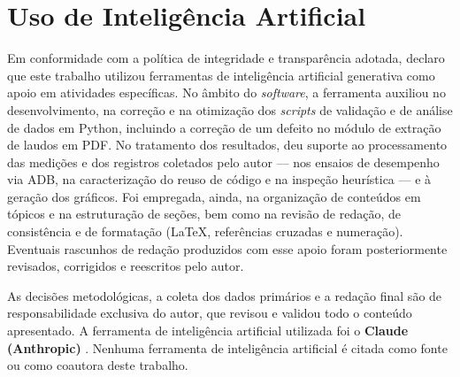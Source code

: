 
\section*{Uso de Inteligência Artificial}

Em conformidade com a política de integridade e transparência adotada, declaro que
este trabalho utilizou ferramentas de inteligência artificial generativa como apoio
em atividades específicas. No âmbito do \emph{software}, a ferramenta auxiliou no
desenvolvimento, na correção e na otimização dos \emph{scripts} de validação e de
análise de dados em Python, incluindo a correção de um defeito no módulo de
extração de laudos em PDF. No tratamento dos resultados, deu suporte ao
processamento das medições e dos registros coletados pelo autor --- nos ensaios de
desempenho via ADB, na caracterização do reuso de código e na inspeção heurística
--- e à geração dos gráficos. Foi empregada, ainda, na organização de conteúdos em
tópicos e na estruturação de seções, bem como na revisão de redação, de
consistência e de formatação (LaTeX, referências cruzadas e numeração). Eventuais
rascunhos de redação produzidos com esse apoio foram posteriormente revisados,
corrigidos e reescritos pelo autor.

As decisões metodológicas, a coleta dos dados primários e a redação final são de
responsabilidade exclusiva do autor, que revisou e validou todo o conteúdo
apresentado. A ferramenta de inteligência artificial utilizada foi o
\textbf{Claude (Anthropic)}%
. Nenhuma ferramenta de inteligência artificial é citada como fonte ou como
coautora deste trabalho.
